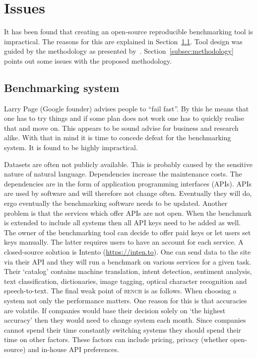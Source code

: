 \section{Issues}
\label{sec:issues}

It has been found that creating an open-source reproducible benchmarking tool is impractical.
The reasons for this are explained in Section~\ref{subsec:benchmarking_system}.
Tool design was guided by the methodology as presented by~\citet{braun2017}.
Section~\ref{subsec:methodology} points out some issues with the proposed methodology.

\subsection{Benchmarking system}
\label{subsec:benchmarking_system}
Larry Page (Google founder) advises people to ``fail fast''.
By this he means that one has to try things and if some plan does not work one has to quickly realise that and move on.
This appears to be sound advise for business and research alike.
With that in mind it is time to concede defeat for the benchmarking system.
It is found to be highly impractical.

Datasets are often not publicly available.
This is probably caused by the sensitive nature of natural language.
Dependencies increase the maintenance costs.
The dependencies are in the form of application programming interfaces (APIs).
APIs are used by software and will therefore not change often.
Eventually they will do, ergo eventually the benchmarking software needs to be updated.
Another problem is that the services which offer APIs are not open.
When the benchmark is extended to include all systems then all API keys need to be added as well.
The owner of the benchmarking tool can decide to offer paid keys or let users set keys manually.
The latter requires users to have an account for each service.
A closed-source solution is Intento (\url{https://inten.to}).
One can send data to the site via their API and they will run a benchmark on various services for a given task.
Their `catalog' contains machine translation, intent detection, sentiment analysis, text classification, dictionaries, image tagging, optical character recognition and speech-to-text.
The final weak point of \textsc{bench} is as follows.
When choosing a system not only the performance matters.
One reason for this is that accuracies are volatile.
If companies would base their decision solely on `the highest accuracy' then they would need to change system each month.
Since companies cannot spend their time constantly switching systems they should spend their time on other factors.
These factors can include pricing, privacy (whether open-source) and in-house API preferences.

